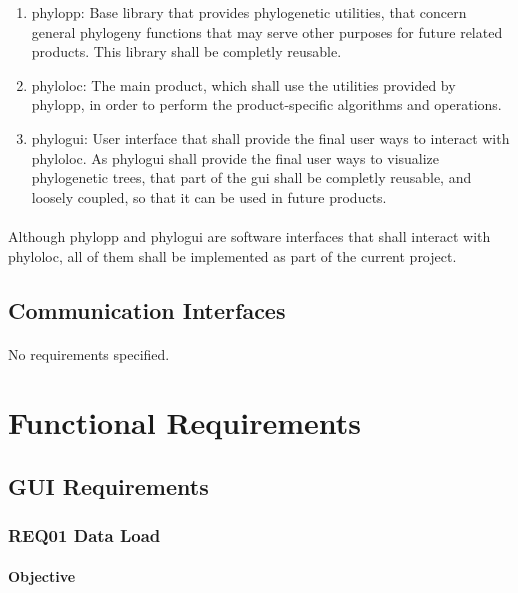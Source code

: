 \documentclass[10pt,a4paper]{article}
\begin{document}
\begin{enumerate}
    \item{phylopp: }
		Base library that provides phylogenetic utilities, that concern general phylogeny functions that may serve other purposes for future related products. This library shall be completly reusable.
    \item{phyloloc: }
		The main product, which shall use the utilities provided by phylopp, in order to perform the product-specific algorithms and operations.
    \item{phylogui: }
		User interface that shall provide the final user ways to interact with phyloloc. As phylogui shall provide the final user ways to visualize phylogenetic trees, that part of the gui shall be completly reusable, and loosely coupled, so that it can be used in future products.

\end{enumerate}
    
\paragraph{}
Although phylopp and phylogui are software interfaces that shall interact with phyloloc, all of them shall be implemented as part of the current project.

\subsection{Communication Interfaces}
\paragraph{}
    No requirements specified.



\section{Functional Requirements}
\label{section-req}  

\subsection{GUI Requirements}

\subsubsection{REQ01 Data Load}
\paragraph{Objective}
\end{document}

